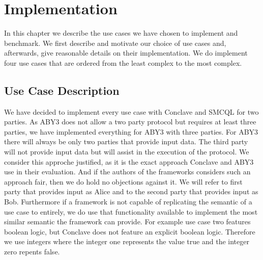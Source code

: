 \chapter{Implementation}
\label{Implementation}	
In this chapter we describe the use cases we have chosen to implement and benchmark. We first describe and motivate our choice of use cases and, afterwards, give reasonable details on their implementation. We do implement four use cases that are ordered from the least complex to the most complex.
\section{Use Case Description}
\label{Use Case}	 
We have decided to implement every use case with Conclave and SMCQL for two parties. As ABY3 does not allow a two party protocol but requires at least three parties, we have implemented everything for ABY3 with three parties. For ABY3 there will always be only two parties that provide input data. The third party will not provide input data but will assist in the execution of the protocol. We consider this approche justified, as it is the exact approach Conclave and ABY3 use in their evaluation. And if the authors of the frameworks considers such an approach fair, then we do hold no objections against it.  
We will refer to first party that provides input as Alice and to the second party that provides input as Bob. Furthermore if a framework is not capable of replicating the semantic of a use case to entirely, we do use that functionality available to implement the most similar semantic the framework can provide. For example use case two features boolean logic, but Conclave does not feature an explicit boolean logic. Therefore we use integers where the integer one represents the value true and the integer zero repents false.   
